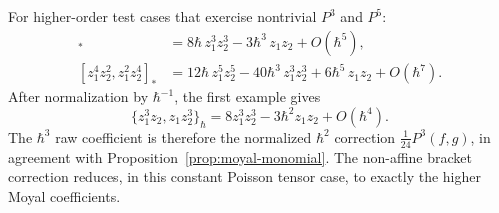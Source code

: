 \documentclass[11pt]{memoir}
\begin{document}
\begin{rmk}
  For higher-order test cases that exercise nontrivial $P^3$ and $P^5$:
  \begin{align*}
    [z_1^3z_2,z_1z_2^3]_*
      &=8\hbar\,z_1^3z_2^3-3\hbar^3\,z_1z_2+O(\hbar^5),\\
    [z_1^4z_2^2,z_1^2z_2^4]_*
      &=12\hbar\,z_1^5z_2^5-40\hbar^3\,z_1^3z_2^3
         +6\hbar^5\,z_1z_2+O(\hbar^7).
  \end{align*}
  After normalization by \(\hbar^{-1}\), the first example gives
  \[
    \{z_1^3z_2,z_1z_2^3\}_\hbar
      =8z_1^3z_2^3-3\hbar^2z_1z_2+O(\hbar^4).
  \]
  The \(\hbar^3\) raw coefficient is therefore the normalized
  \(\hbar^2\) correction \(\frac{1}{24}P^3(f,g)\), in agreement with
  Proposition~\ref{prop:moyal-monomial}. The non-affine bracket
  correction reduces, in this constant Poisson tensor case, to exactly
  the higher Moyal coefficients.
\end{rmk}
\end{document}

